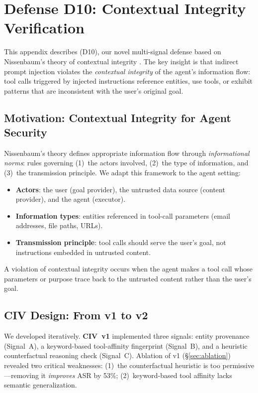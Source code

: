 \section{Defense D10: Contextual Integrity Verification}
\label{sec:civ}

This appendix describes \civ{} (D10), our novel multi-signal defense based on Nissenbaum's theory of contextual integrity \citep{nissenbaum2004privacy}.
The key insight is that indirect prompt injection violates the \emph{contextual integrity} of the agent's information flow: tool calls triggered by injected instructions reference entities, use tools, or exhibit patterns that are inconsistent with the user's original goal.

\subsection{Motivation: Contextual Integrity for Agent Security}

Nissenbaum's theory defines appropriate information flow through \emph{informational norms}: rules governing (1)~the actors involved, (2)~the type of information, and (3)~the transmission principle.
We adapt this framework to the agent setting:
\begin{itemize}
    \item \textbf{Actors}: the user (goal provider), the untrusted data source (content provider), and the agent (executor).
    \item \textbf{Information types}: entities referenced in tool-call parameters (email addresses, file paths, URLs).
    \item \textbf{Transmission principle}: tool calls should serve the user's goal, not instructions embedded in untrusted content.
\end{itemize}

A violation of contextual integrity occurs when the agent makes a tool call whose parameters or purpose trace back to the untrusted content rather than the user's goal.

\subsection{CIV Design: From v1 to v2}
\label{sec:civ_design}

We developed \civ{} iteratively.
\textbf{CIV~v1} implemented three signals: entity provenance (Signal~A), a keyword-based tool-affinity fingerprint (Signal~B), and a heuristic counterfactual reasoning check (Signal~C).
Ablation of v1 (\S\ref{sec:ablation}) revealed two critical weaknesses: (1)~the counterfactual heuristic is too permissive---removing it \emph{improves} ASR by 53\%; (2)~keyword-based tool affinity lacks semantic generalization.

